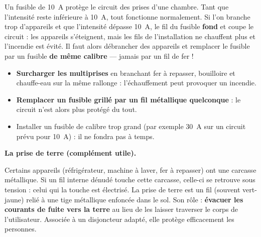 \documentclass[11pt]{article}
\newcommand{\cle}[1]{{\popxbold\color{popdark}#1}}
\begin{document}
\begin{exemplebox}[Un fusible de 10 A]
Un fusible de \SI{10}{A} protège le circuit des prises d'une chambre. Tant que l'intensité reste inférieure à \SI{10}{A}, tout fonctionne normalement. Si l'on branche trop d'appareils et que l'intensité dépasse \SI{10}{A}, le fil du fusible \textbf{fond} et coupe le circuit : les appareils s'éteignent, mais les fils de l'installation ne chauffent plus et l'incendie est évité. Il faut alors débrancher des appareils et remplacer le fusible par un fusible \textbf{de même calibre} — jamais par un fil de fer !
\end{exemplebox}

\begin{attention}
\begin{itemize}
\item \textbf{Surcharger les multiprises} en branchant fer à repasser, bouilloire et chauffe-eau sur la même rallonge : l'échauffement peut provoquer un incendie.
\item \textbf{Remplacer un fusible grillé par un fil métallique quelconque} : le circuit n'est alors plus protégé du tout.
\item Installer un fusible de calibre trop grand (par exemple \SI{30}{A} sur un circuit prévu pour \SI{10}{A}) : il ne fondra pas à temps.
\end{itemize}
\end{attention}

\textbf{La prise de terre (complément utile).}\par

Certains appareils (réfrigérateur, machine à laver, fer à repasser) ont une carcasse métallique. Si un fil interne dénudé touche cette carcasse, celle-ci se retrouve sous tension : celui qui la touche est électrisé. La \cle{prise de terre} est un fil (souvent vert-jaune) relié à une tige métallique enfoncée dans le sol. Son rôle : \textbf{évacuer les courants de fuite vers la terre} au lieu de les laisser traverser le corps de l'utilisateur. Associée à un disjoncteur adapté, elle protège efficacement les personnes.
\end{document}
